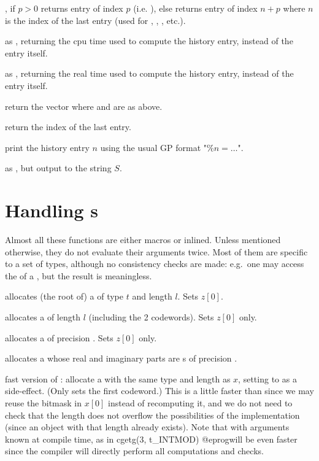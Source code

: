 , if $p>0$ returns entry of index $p$
(i.e. ), else returns entry of index $n+p$ where $n$ is the
index of the last entry (used for \kbd{\%}, , , etc.).

 as ,
returning the cpu time used to compute the history entry, instead of the entry
itself.

 as ,
returning the real time used to compute the history entry, instead of the entry
itself.

 return the vector  where
 and  are as above.

 return the index of the last entry.

 print the history entry $n$ using the
usual GP format "$\%n = \dots$".

 as ,
but output to the string $S$.

\section{Handling s}
\noindent Almost all these functions are either macros or inlined. Unless
mentioned otherwise, they do not evaluate their arguments twice. Most of them
are specific to a set of types, although no consistency checks are made:
e.g.~one may access the  of a , but the result is
meaningless.


 allocates (the root of) a 
of type $t$ and length $l$. Sets $z[0]$.

 allocates a  of length $l$ (including the
2 codewords). Sets $z[0]$ only.

 allocates a  of precision .
Sets $z[0]$ only.

 allocates a  whose real and
imaginary parts are s of precision .

 fast version of :
allocate a  with the same type and length as $x$, setting 
to  as a side-effect. (Only sets the first codeword.) This is
a little faster than  since we may reuse the bitmask in
$x[0]$ instead of recomputing it, and we do not need to check that the
length does not overflow the possibilities of the
implementation (since an object with that length already exists). Note that
 with arguments known at compile time, as in
\bprog
  cgetg(3, t_INTMOD)
@eprog\noindent will be even faster since the compiler will directly perform
all computations and checks.

